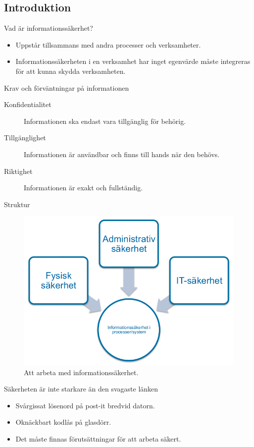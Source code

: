 \documentclass{beamer}
\begin{document}
\subsection{Introduktion}
\begin{frame}{Vad är informationssäkerhet?}
  \begin{itemize}
    \item Uppstår tillsammans med andra processer och verksamheter.
    \item Informationssäkerheten i en verksamhet har inget egenvärde måste 
      integreras för att kunna skydda verksamheten.
  \end{itemize}
\end{frame}
\begin{frame}{Krav och förväntningar på informationen}
  \begin{description}
    \item[Konfidentialitet] Informationen ska endast vara tillgänglig för 
      behörig.
    \item[Tillgänglighet] Informationen är användbar och finns till hands när 
      den behövs.
    \item[Riktighet] Informationen är exakt och fullständig.
  \end{description}
\end{frame}
\begin{frame}{Struktur}
  \begin{figure}
    \includegraphics[height=0.7\textheight]{infosak-process.png}
    \caption{Att arbeta med informationssäkerhet.}
  \end{figure}
\end{frame}
\begin{frame}{Säkerheten är inte starkare än den svagaste länken}
  \begin{itemize}
    \item Svårgissat lösenord på post-it bredvid datorn.
    \item Oknäckbart kodlås på glasdörr.
    \item Det måste finnas förutsättningar för att arbeta säkert.
  \end{itemize}
\end{frame}
\end{document}

